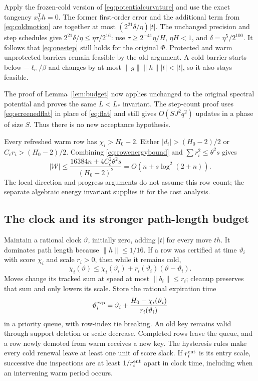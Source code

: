 \documentclass[11pt]{amsart}
\theoremstyle{remark}\newtheorem{remark}[theorem]{Remark}
\newcommand{\T}{\mathsf T}
\begin{document}
Apply the frozen-cold version of \eqref{eq:potentialcurvature} and use
the exact tangency $x_V^\T h=0$.
The former first-order error and the additional term from
\eqref{eq:coldmotion} are together at most
$(2^{21}\delta/\eta)|t|$.
The unchanged precision and step schedules give
$2^{21}\delta/\eta\le\eta\tau/2^{16}$:
use $\tau\ge2^{-41}\eta/H$, $\eta H<1$, and
$\delta=\eta^5/2^{100}$.
It follows that \eqref{eq:onestep} still holds for the original $\Phi$.
Protected and warm unprotected barriers remain feasible by the old
argument. A cold barrier starts below $-\ell_c/\beta$ and changes by at
most $\|g\|\|h\||t|<|t|$, so it also stays feasible.

The proof of Lemma~\ref{lem:budget} now applies unchanged to the original
spectral potential and proves the same $L<L_*$ invariant.
The step-count proof uses \eqref{eq:screenedflat} in place of
\eqref{eq:flat} and still gives $O(SJ^2q^2)$ updates in a phase of size
$S$. Thus there is no new acceptance hypothesis.

Every refreshed warm row has $\chi_i>H_0-2$. Either
$|d_i|>(H_0-2)/2$ or $C_cr_i>(H_0-2)/2$. Combining
\eqref{eq:rowenergybound} and $\sum r_i^2\le\theta^2s$ gives
\begin{equation}\label{eq:warmcount}
 |\mathcal W|\le
 \frac{16384n+4C_c^2\theta^2s}{(H_0-2)^2}
 =O(n+s\log^2(2+n)).
\end{equation}
The local direction and progress arguments do not assume this row count;
the separate algebraic energy invariant supplies it for the cost analysis.

\subsection{The clock and its stronger path-length budget}\label{sec:clock}
Maintain a rational clock $\vartheta$, initially zero, adding $|t|$ for
every move $th$. It dominates path length because $\|h\|\le1/16$.
If a row was certified at time $\vartheta_i$ with score $\chi_i$ and
scale $r_i>0$, then while it remains cold,
\[
 \chi_i(\vartheta)\le\chi_i(\vartheta_i)
                        +r_i(\vartheta_i)(\vartheta-\vartheta_i).
\]
Moves change its tracked sum at speed at most $\|b_i\|\le r_i$;
cleanup preserves that sum and only lowers its scale. Store the rational
expiration time
\[
 \vartheta_i^{\rm exp}
 =\vartheta_i+\frac{H_0-\chi_i(\vartheta_i)}{r_i(\vartheta_i)}
\]
in a priority queue, with row-index tie breaking. An old key remains valid
through support deletion or scale decrease. Completed rows leave the
queue, and a row newly demoted from warm receives a new key.
The hysteresis rules make every cold renewal leave at least one unit of
score slack. If $r_i^{\rm ent}$ is its entry scale, successive due
inspections are at least $1/r_i^{\rm ent}$ apart in clock time, including
when an intervening warm period occurs.
\end{document}
